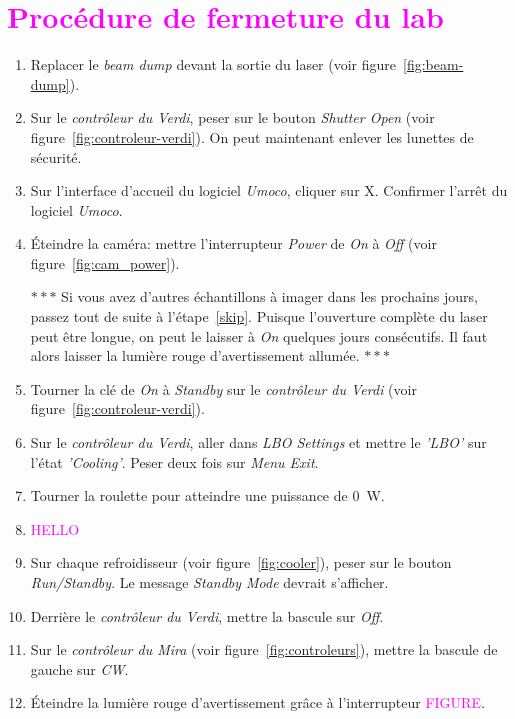 \section{\textcolor{magenta}{Procédure de fermeture du lab}}


\begin{enumerate}
    \item Replacer le \textit{beam dump} devant la sortie du laser (voir figure~\ref{fig:beam-dump}).
    \item Sur le \textit{contrôleur du Verdi}, peser sur le bouton \textit{Shutter Open} (voir figure~\ref{fig:controleur-verdi}). On peut maintenant enlever les lunettes de sécurité.
    \item Sur l'interface d'accueil du logiciel \textit{Umoco}, cliquer sur X. Confirmer l'arrêt du logiciel \textit{Umoco}.
    \item Éteindre la caméra: mettre l'interrupteur \textit{Power} de \textit{On} à \textit{Off} (voir figure~\ref{fig:cam_power}).
\begin{center} $\ast\ast\ast$ Si vous avez d'autres échantillons à imager dans les prochains jours, passez tout de suite à l'étape~\ref{skip}. Puisque l'ouverture complète du laser peut être longue, on peut le laisser à \textit{On} quelques jours consécutifs. Il faut alors laisser la lumière rouge d'avertissement allumée.  $\ast\ast\ast$ \end{center}
    \item Tourner la clé de \textit{On} à \textit{Standby} sur le \textit{contrôleur du Verdi} (voir figure~\ref{fig:controleur-verdi}).
    \item Sur le \textit{contrôleur du Verdi}, aller dans \textit{LBO Settings} et mettre le \textit{'LBO'} sur l'état \textit{'Cooling'}. Peser deux fois sur \textit{Menu Exit}.
    \item Tourner la roulette pour atteindre une puissance de 0~W.
    \item \textcolor{magenta}{HELLO}
    \item Sur chaque refroidisseur (voir figure~\ref{fig:cooler}), peser sur le bouton \textit{Run/Standby}. Le message \textit{Standby Mode} devrait s'afficher.
    \item Derrière le \textit{contrôleur du Verdi}, mettre la bascule sur \textit{Off}.
    \item Sur le \textit{contrôleur du Mira} (voir figure~\ref{fig:controleurs}), mettre la bascule de gauche sur \textit{CW}.
    \item Éteindre la lumière rouge d'avertissement grâce à l'interrupteur \textcolor{magenta}{FIGURE}.

\end{enumerate}
